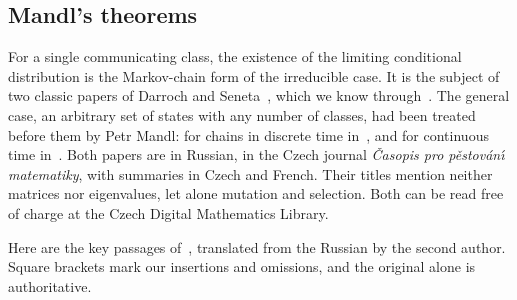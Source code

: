 \documentclass[11pt]{article}
\theoremstyle{definition}
\theoremstyle{remark}
\begin{document}
\subsection{Mandl's theorems}\label{sec:related:mandl}

For a single communicating class, the existence of the limiting conditional distribution is the
Markov-chain form of the irreducible case. It is the subject of two classic papers of Darroch
and Seneta~\cite{DS65,DS67}, which we know through~\cite{vDP08,vDP13}. The general case, an
arbitrary set of states with any number of classes, had been treated before them by Petr Mandl:
for chains in discrete time in~\cite{Mandl59}, and for continuous time in~\cite{Mandl60}. Both
papers are in Russian, in the Czech journal \emph{\v{C}asopis pro p\v{e}stov\'an\'{\i}
matematiky}, with summaries in Czech and French. Their titles mention neither matrices nor
eigenvalues, let alone mutation and selection. Both can be read free of charge at the Czech
Digital Mathematics Library.

Here are the key passages of~\cite{Mandl60}, translated from the Russian by the second author.
Square brackets mark our insertions and omissions, and the original alone is authoritative.
\end{document}
